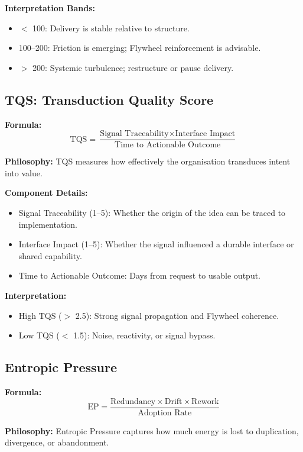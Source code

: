 \documentclass[12pt]{article}
\begin{document}
\textbf{Interpretation Bands:}
\begin{itemize}
    \item $<$ 100: Delivery is stable relative to structure.
    \item 100--200: Friction is emerging; Flywheel reinforcement is advisable.
    \item $>$ 200: Systemic turbulence; restructure or pause delivery.
\end{itemize}

\subsection{TQS: Transduction Quality Score}

\textbf{Formula:}
\[
\text{TQS} = \frac{\text{Signal Traceability} \times \text{Interface Impact}}{\text{Time to Actionable Outcome}}
\]

\textbf{Philosophy:} TQS measures how effectively the organisation transduces intent into value.

\textbf{Component Details:}
\begin{itemize}
    \item Signal Traceability (1–5): Whether the origin of the idea can be traced to implementation.
    \item Interface Impact (1–5): Whether the signal influenced a durable interface or shared capability.
    \item Time to Actionable Outcome: Days from request to usable output.
\end{itemize}

\textbf{Interpretation:}
\begin{itemize}
    \item High TQS ($>$ 2.5): Strong signal propagation and Flywheel coherence.
    \item Low TQS ($<$ 1.5): Noise, reactivity, or signal bypass.
\end{itemize}

\subsection{Entropic Pressure}

\textbf{Formula:}
\[
\text{EP} = \frac{\text{Redundancy} \times \text{Drift} \times \text{Rework}}{\text{Adoption Rate}}
\]

\textbf{Philosophy:} Entropic Pressure captures how much energy is lost to duplication, divergence, or abandonment.
\end{document}
